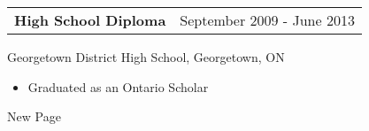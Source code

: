 \documentclass[12pt]{article}
\begin{document}
\vspace{12pt}

{
  \small
  \noindent\begin{tabu} {@{} X[l] X[r]}
    \textbf{High School Diploma} & September 2009 - June 2013
  \end{tabu}
  Georgetown District High School, Georgetown, ON
  \begin{itemize}
    \item Graduated as an Ontario Scholar
  \end{itemize}
}
\newpage
\pagestyle{normal}
New Page
\end{document}
